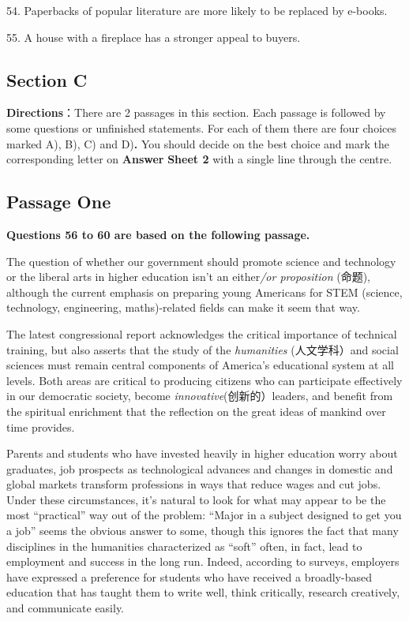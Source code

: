 \documentclass[UTF8,11pt]{ctexart}
\begin{document}
54. Paperbacks of popular literature are more likely to be replaced by e-books.


55. A house with a fireplace has a stronger appeal to buyers.


\subsection*{Section C}


\textbf{Directions}：There are 2 passages in this section. Each passage is followed by some questions or unfinished statements. For each of them there are four choices marked A), B), C) and D)\textbf{.} You should decide on the best choice and mark the corresponding letter on\textbf{ Answer} \textbf{Sheet 2} with a single line through the centre.


\subsection*{Passage One}


\textbf{Questions 56 to 60 are based on the following passage.}


The question of whether our government should promote science and technology or the liberal arts in higher education isn’t an either\textit{/or proposition} (命题), although the current emphasis on preparing young Americans for STEM (science, technology, engineering, maths)-related fields can make it seem that way.


The latest congressional report acknowledges the critical importance of technical training, but also asserts that the study of the\textit{ humanities} (人文学科）and social sciences must remain central components of America’s educational system at all levels. Both areas are critical to producing citizens who can participate effectively in our democratic society, become\textit{ innovative}(创新的）leaders, and benefit from the spiritual enrichment that the reflection on the great ideas of mankind over time provides.


Parents and students who have invested heavily in higher education worry about graduates, job prospects as technological advances and changes in domestic and global markets transform professions in ways that reduce wages and cut jobs. Under these circumstances, it’s natural to look for what may appear to be the most “practical” way out of the problem: “Major in a subject designed to get you a job” seems the obvious answer to some, though this ignores the fact that many disciplines in the humanities characterized as “soft” often, in fact, lead to employment and success in the long run. Indeed, according to surveys, employers have expressed a preference for students who have received a broadly-based education that has taught them to write well, think critically, research creatively, and communicate easily.
\end{document}
